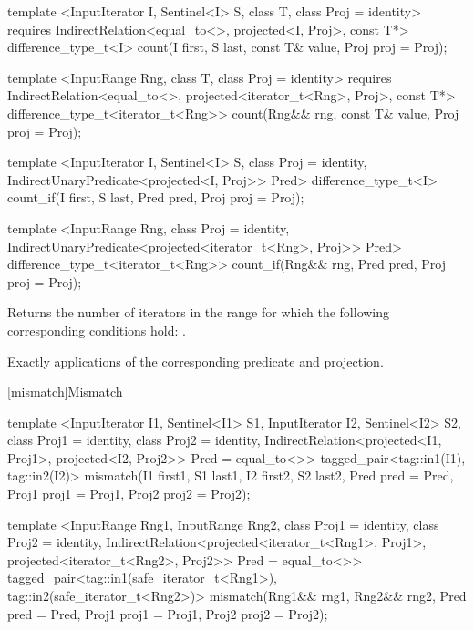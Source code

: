 %
%
\begin{itemdecl}
template <InputIterator I, Sentinel<I> S, class T, class Proj = identity>
  requires IndirectRelation<equal_to<>, projected<I, Proj>, const T*>
  difference_type_t<I>
    count(I first, S last, const T& value, Proj proj = Proj{});

template <InputRange Rng, class T, class Proj = identity>
  requires IndirectRelation<equal_to<>, projected<iterator_t<Rng>, Proj>, const T*>
  difference_type_t<iterator_t<Rng>>
    count(Rng&& rng, const T& value, Proj proj = Proj{});

template <InputIterator I, Sentinel<I> S, class Proj = identity,
    IndirectUnaryPredicate<projected<I, Proj>> Pred>
  difference_type_t<I>
    count_if(I first, S last, Pred pred, Proj proj = Proj{});

template <InputRange Rng, class Proj = identity,
    IndirectUnaryPredicate<projected<iterator_t<Rng>, Proj>> Pred>
  difference_type_t<iterator_t<Rng>>
    count_if(Rng&& rng, Pred pred, Proj proj = Proj{});
\end{itemdecl}

\begin{itemdescr}
\pnum
\effects
Returns the number of iterators
in the range 
for which the following corresponding
conditions hold:
.

\pnum
\complexity
Exactly
applications of the corresponding predicate and projection.
\end{itemdescr}

[mismatch]{Mismatch}

%
\begin{itemdecl}
template <InputIterator I1, Sentinel<I1> S1, InputIterator I2, Sentinel<I2> S2,
    class Proj1 = identity, class Proj2 = identity,
    IndirectRelation<projected<I1, Proj1>, projected<I2, Proj2>> Pred = equal_to<>>
  tagged_pair<tag::in1(I1), tag::in2(I2)>
    mismatch(I1 first1, S1 last1, I2 first2, S2 last2, Pred pred = Pred{},
             Proj1 proj1 = Proj1{}, Proj2 proj2 = Proj2{});

template <InputRange Rng1, InputRange Rng2,
    class Proj1 = identity, class Proj2 = identity,
    IndirectRelation<projected<iterator_t<Rng1>, Proj1>,
      projected<iterator_t<Rng2>, Proj2>> Pred = equal_to<>>
  tagged_pair<tag::in1(safe_iterator_t<Rng1>), tag::in2(safe_iterator_t<Rng2>)>
    mismatch(Rng1&& rng1, Rng2&& rng2, Pred pred = Pred{},
             Proj1 proj1 = Proj1{}, Proj2 proj2 = Proj2{});
\end{itemdecl}

